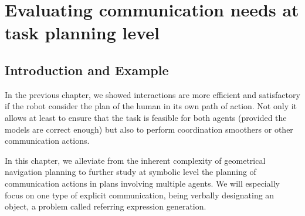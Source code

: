 \documentclass[a4paper,11pt,twoside]{StyleThese}
\begin{document}
\setcounter{chapter}{2} %
\dominitoc
\faketableofcontents
\fi

\chapter{Evaluating communication needs at task planning level}
\minitoc

\section{Introduction and Example}
In the previous chapter, we showed interactions are more efficient and satisfactory if the robot consider the plan of the human in its own path of action. Not only it allows at least to ensure that the task is feasible for both agents (provided the models are correct enough) but also to perform coordination smoothers or other communication actions.

In this chapter, we alleviate from the inherent complexity of geometrical navigation planning to further study at symbolic level the planning of communication actions in plans involving multiple agents. We will especially focus on one type of explicit communication, being verbally designating an object, a problem called referring expression generation.
\end{document}
